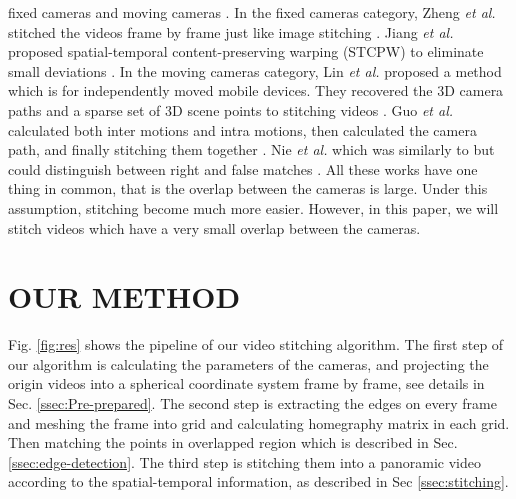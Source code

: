 \documentclass[conference]{IEEEtran}
\begin{document}
fixed cameras \cite{zheng2008stitching, he2010panoramic, Jiang_2015_CVPR_Workshops, perazzi2015panoramic, li2015efficient} 
and moving cameras \cite{lin2016seamless, guo2016joint, nie2018dynamic}. In the fixed cameras category, 
Zheng \textit{et al.} stitched the videos frame by frame just like image stitching \cite{zheng2008stitching}.
Jiang \textit{et al.} proposed spatial-temporal content-preserving warping (STCPW) to eliminate small deviations \cite{Jiang_2015_CVPR_Workshops}.
In the moving cameras category, Lin \textit{et al.} proposed a method which is for independently moved mobile devices.
They recovered the 3D camera paths and a sparse set of 3D scene points to stitching videos \cite{lin2016seamless}.
Guo \textit{et al.} calculated both inter motions and intra motions, then calculated the camera path, and finally stitching them together \cite{guo2016joint}.
Nie \textit{et al.} which was similarly to \cite{guo2016joint} but could distinguish between right
and false matches \cite{nie2018dynamic}. All these works have one thing in common, that
is the overlap between the cameras is large. Under this assumption, stitching 
become much more easier. However, in this paper, we will stitch videos
which have a very small overlap between the cameras.

\section{OUR METHOD}
\label{sec:ourmethod}

Fig. \ref{fig:res} shows the pipeline of our video stitching algorithm.
The first step of our algorithm is calculating the parameters of the cameras, and projecting the origin videos into a spherical coordinate system frame by frame, 
see details in Sec. \ref{ssec:Pre-prepared}. The second step is extracting the edges on every frame and meshing the frame into grid and calculating homegraphy matrix in each grid. 
Then matching the points in overlapped region which is described in Sec. \ref{ssec:edge-detection}. 
The third step is stitching them into a panoramic video according to the spatial-temporal information, as described in Sec \ref{ssec:stitching}.
\end{document}

